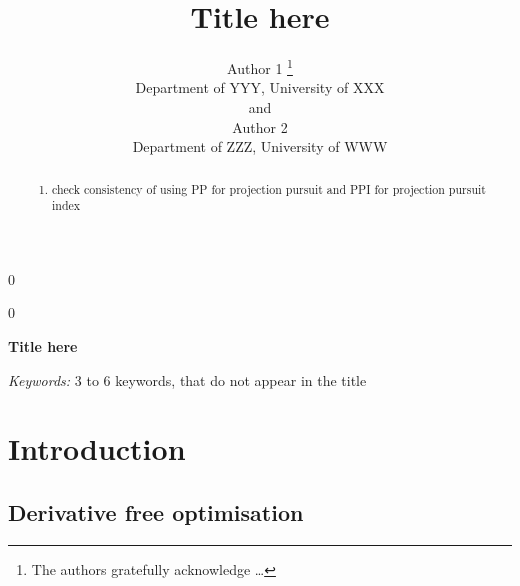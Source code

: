 \documentclass[12pt]{article}
\providecommand{\tightlist}{%
  \setlength{\itemsep}{0pt}\setlength{\parskip}{0pt}}
\newcommand{\blind}{0}
\begin{document}
\def\spacingset#1{\renewcommand{\baselinestretch}%
{#1}\small\normalsize} \spacingset{1}



\blind
{
  \title{\bf Title here}

  \author{
        Author 1 \thanks{The authors gratefully acknowledge \ldots{}} \\
    Department of YYY, University of XXX\\
     and \\     Author 2 \\
    Department of ZZZ, University of WWW\\
      }
  \maketitle
} \fi

\blind
{
  \bigskip
  \bigskip
  \bigskip
  \begin{center}
    {\LARGE\bf Title here}
  \end{center}
  \medskip
} \fi

\bigskip
\begin{abstract}
\begin{enumerate}
\def\labelenumi{\arabic{enumi}.}
\tightlist
\item
  check consistency of using PP for projection pursuit and PPI for
  projection pursuit index
\end{enumerate}
\end{abstract}

\noindent%
{\it Keywords:} 3 to 6 keywords, that do not appear in the title
\vfill

\newpage
\spacingset{1.45} %

\hypertarget{introduction}{%
\section{Introduction}\label{introduction}}

\hypertarget{derivative-free-optimisation}{%
\subsection{Derivative free
optimisation}\label{derivative-free-optimisation}}
\end{document}
